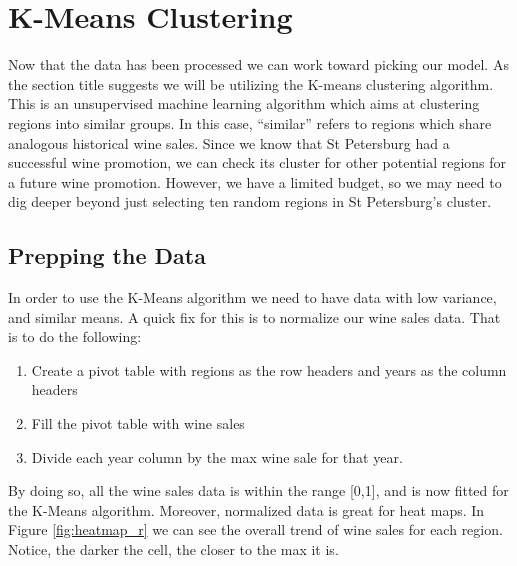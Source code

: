 \documentclass{article}
\begin{document}
\section{K-Means Clustering}
Now that the data has been processed we can work toward picking our model. As the section title suggests we will be utilizing the K-means clustering algorithm. This is an unsupervised machine learning algorithm which aims at clustering regions into similar groups. In this case, ``similar'' refers to regions which share analogous historical wine sales. Since we know that St Petersburg had a successful wine promotion, we can check its cluster for other potential regions for a future wine promotion. However, we have a limited budget, so we may need to dig deeper beyond just selecting ten random regions in St Petersburg's cluster. 

\subsection{Prepping the Data}
In order to use the K-Means algorithm we need to have data with low variance, and similar means. A quick fix for this is to normalize our wine sales data. That is to do the following:
\begin{enumerate}
    \item Create a pivot table with regions as the row headers and years as the column headers
    \item Fill the pivot table with wine sales
    \item Divide each year column by the max wine sale for that year.
\end{enumerate}

\noindent By doing so, all the wine sales data is within the range [0,1], and is now fitted for the K-Means algorithm. Moreover, normalized data is great for heat maps. In Figure \ref{fig:heatmap_r} we can see the overall trend of wine sales for each region. Notice, the darker the cell, the closer to the max it is.
\end{document}

